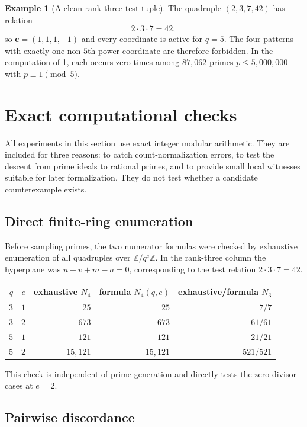 \documentclass[11pt]{article}
\theoremstyle{definition}
\newtheorem{example}[theorem]{Example}
\theoremstyle{remark}
\newcommand{\Z}{\mathbb{Z}}
\begin{document}
\begin{example}[A clean rank-three test tuple]
The quadruple $(2,3,7,42)$ has relation
\[
       2\cdot3\cdot7=42,
\]
so $\bm c=(1,1,1,-1)$ and every coordinate is active for $q=5$.  The four patterns with exactly
one non-$5$th-power coordinate are therefore forbidden.  In the computation of
\cref{sec:experiments}, each occurs zero times among $87{,}062$ primes $p\le5{,}000{,}000$ with
$p\equiv1\pmod5$.
\end{example}

\section{Exact computational checks}
\label{sec:experiments}

All experiments in this section use exact integer modular arithmetic.  They are included for
three reasons: to catch count-normalization errors, to test the descent from prime ideals to
rational primes, and to provide small local witnesses suitable for later formalization.  They do
not test whether a candidate counterexample exists.

\subsection{Direct finite-ring enumeration}

Before sampling primes, the two numerator formulas were checked by exhaustive enumeration of
all quadruples over $\Z/q^e\Z$.  In the rank-three column the hyperplane was
$u+v+m-a=0$, corresponding to the test relation $2\cdot3\cdot7=42$.
\begin{center}
\begin{tabular}{rrrrr}
\toprule
$q$ & $e$ & exhaustive $N_4$ & formula $N_4(q,e)$ & exhaustive/formula $N_3$\\
\midrule
$3$ & $1$ & $25$    & $25$    & $7/7$\\
$3$ & $2$ & $673$   & $673$   & $61/61$\\
$5$ & $1$ & $121$   & $121$   & $21/21$\\
$5$ & $2$ & $15{,}121$ & $15{,}121$ & $521/521$\\
\bottomrule
\end{tabular}
\end{center}
This check is independent of prime generation and directly tests the zero-divisor cases at
$e=2$.

\subsection{Pairwise discordance}
\end{document}
